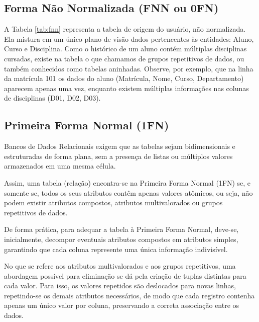 \subsection{Forma Não Normalizada (FNN ou 0FN)}

A Tabela \ref{tab:fnn} representa a tabela de origem do usuário, não normalizada. Ela mistura em um único plano de visão dados pertencentes às entidades: Aluno, Curso e Disciplina. Como o histórico de um aluno contém múltiplas disciplinas cursadas, existe na tabela o que chamamos de grupos repetitivos de dados, ou também conhecidos como tabelas aninhadas. Observe, por exemplo, que na linha da matrícula 101 os dados do aluno (Matrícula, Nome, Curso, Departamento) aparecem apenas uma vez, enquanto existem múltiplas informações nas colunas de disciplinas (D01, D02, D03).

\subsection{Primeira Forma Normal (1FN)}

Bancos de Dados Relacionais exigem que as tabelas sejam bidimensionais e estruturadas de forma plana, sem a presença de listas ou múltiplos valores armazenados em uma mesma célula.

Assim, uma tabela (relação) encontra-se na Primeira Forma Normal (1FN) se, e somente se, todos os seus atributos contêm apenas valores atômicos, ou seja, não podem existir atributos compostos, atributos multivalorados ou grupos repetitivos de dados.

De forma prática, para adequar a tabela à Primeira Forma Normal, deve-se, inicialmente, decompor eventuais atributos compostos em atributos simples, garantindo que cada coluna represente uma única informação indivisível.

No que se refere aos atributos multivalorados e aos grupos repetitivos, uma abordagem possível para eliminação se dá pela criação de tuplas distintas para cada valor. Para isso, os valores repetidos são deslocados para novas linhas, repetindo-se os demais atributos necessários, de modo que cada registro contenha apenas um único valor por coluna, preservando a correta associação entre os dados.


